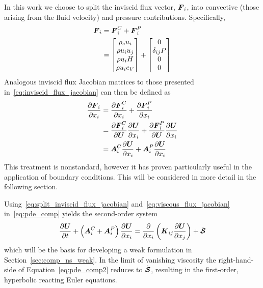 In this work we choose to split the inviscid flux vector, ${\boldsymbol{F}}_i$, into convective (those arising from the fluid velocity) and pressure contributions.  Specifically, 
\begin{align}
  {\boldsymbol{F}}_i &= {\boldsymbol{F}}^C_i + {\boldsymbol{F}}^P_i \\
           &= \begin{bmatrix}
             \rho_s u_i       \\
             \rho u_i u_j \\
             \rho u_i H \\
             \rho u_i e_V 
             \end{bmatrix} +
              \begin{bmatrix}
             0 \\
             \delta_{ij} P \\
             0 \\
             0
             \end{bmatrix}
\end{align}
Analogous inviscid flux Jacobian matrices to those presented in~\eqref{eq:inviscid_flux_jacobian} can then be defined as
\begin{align}
  {\frac{\partial{{\boldsymbol{F}}_i}}{\partial{x_i}}} &= {\frac{\partial{{\boldsymbol{F}}^C_i}}{\partial{x_i}}} + {\frac{\partial{{\boldsymbol{F}}^P_i}}{\partial{x_i}}} \\
                      &= {\frac{\partial{{\boldsymbol{F}}^C_i}}{\partial{{\boldsymbol{U}}}}} {\frac{\partial{{\boldsymbol{U}}}}{\partial{x_i}}} +
                         {\frac{\partial{{\boldsymbol{F}}^P_i}}{\partial{{\boldsymbol{U}}}}} {\frac{\partial{{\boldsymbol{U}}}}{\partial{x_i}}} \\
                      &= {\boldsymbol{A}}^C_i {\frac{\partial{{\boldsymbol{U}}}}{\partial{x_i}}} + {\boldsymbol{A}}^P_i {\frac{\partial{{\boldsymbol{U}}}}{\partial{x_i}}}
                      \label{eq:split_inviscid_flux_jacobian}
\end{align}
This treatment is nonstandard, however it has proven particularly useful in the application of boundary conditions.  This will be considered in more detail in the following section.

Using~\eqref{eq:split_inviscid_flux_jacobian} and~\eqref{eq:viscous_flux_jacobian} in~\eqref{eq:pde_comp} yields the second-order system
\begin{equation}
  \label{eq:pde_comp2}
  {\frac{\partial{{\boldsymbol{U}}}}{\partial{t}}} + \left({\boldsymbol{A}}^C_i + {\boldsymbol{A}}^P_i\right){\frac{\partial{{\boldsymbol{U}}}}{\partial{x_i}}} =
    {\frac{\partial{}}{\partial{x_i}}} \left( {\boldsymbol{K}}_{ij} {\frac{\partial{{\boldsymbol{U}}}}{\partial{x_j}}} \right) + \dot{{\boldsymbol{\mathcal{S}}}}
\end{equation}
which will be the basis for developing a weak formulation in Section~\ref{sec:comp_ns_weak}.  In the limit of vanishing viscosity the right-hand-side of Equation~\eqref{eq:pde_comp2} reduces to $\dot{{\boldsymbol{\mathcal{S}}}}$, resulting in the first-order, hyperbolic reacting Euler equations.

